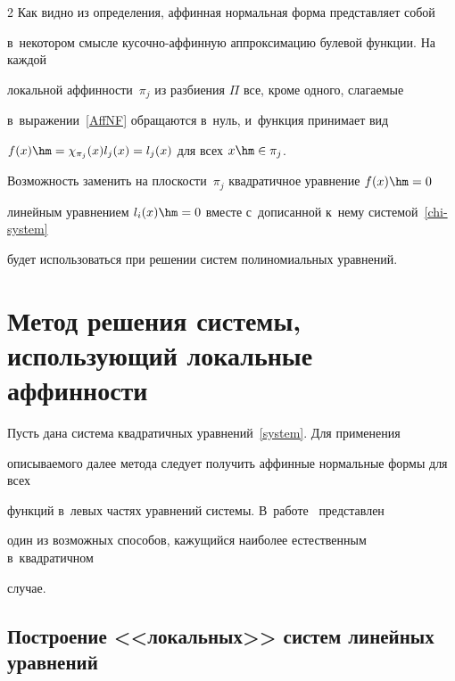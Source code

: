 \begin{multicols}{2}
Как видно из определения, аффинная нормальная форма представляет собой 


в~некотором смыс\-ле ку\-соч\-но-аффин\-ную аппроксимацию булевой функции. На каждой 


локальной аф\-фин\-ности~$\pi_j$ из разбиения $\Pi$ все, кроме одного, слагаемые 


в~выражении~\eqref{AffNF} обращаются в~нуль, и~функция принимает вид 


$f(x)\hm=\chi_{\pi_j}(x)l_j(x)=l_j(x)$ для всех $x\hm\in\pi_j$.





Возможность заменить на плоскости~$\pi_j$ квадратичное уравнение $f(x)\hm=0$ 


линейным уравнением $l_i(x)\hm=0$ вместе с~дописанной к~нему системой~\eqref{chi-system} 


будет использоваться при решении систем полиномиальных уравнений.








\section{Метод решения системы, использующий локальные аффинности}


\label{method}





Пусть дана система квадратичных уравнений~\eqref{system}. Для применения 


описываемого далее метода следует получить аффинные нормальные формы для всех 


функций в~левых частях уравнений системы. В~работе~\cite{LSF2019} пред\-став\-лен 


один из возможных способов, кажущийся наиболее естественным в~квадратичном 


случае.











\subsection{Построение <<локальных>> систем линейных уравнений}






\end{multicols}

